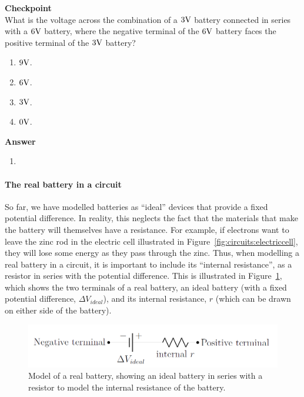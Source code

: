 \begin{framed}
\textbf{Checkpoint}\\
What is the voltage across the combination of a $3 {\rm V}$ battery connected in series with a $6 {\rm V}$ battery, where the negative terminal of the $6 {\rm V}$ battery faces the positive terminal of the $3 {\rm V}$ battery?

\begin{enumerate}
\item $9 {\rm V}$.
\item $6 {\rm V}$.
\item $3 {\rm V}$.
\item $0 {\rm V}$.
\end{enumerate}

\begin{framed}
\textbf{Answer}\\
\begin{enumerate}
\item
\end{enumerate}
\end{framed}
\end{framed}

\paragraph{The real battery in a circuit}

So far, we have modelled batteries as ``ideal'' devices that provide a fixed potential difference. In reality, this neglects the fact that the materials that make the battery will themselves have a resistance. For example, if electrons want to leave the zinc rod in the electric cell illustrated in Figure~\ref{fig:circuits:electriccell}, they will lose some energy as they pass through the zinc. Thus, when modelling a real battery in a circuit, it is important to include its ``internal resistance'', as a resistor in series with the potential difference. This is illustrated in Figure~\ref{fig:circuits:realbattery}, which shows the two terminals of a real battery, an ideal battery (with a fixed potential difference, $\Delta V_{ideal}$), and its internal resistance, $r$ (which can be drawn on either side of the battery).

\begin{figure}[!htbp]
\centering
\includegraphics[width=0.8\linewidth]{files/realbattery-25df902f5102763e8da286f2d44bddb1.png}
\caption[]{Model of a real battery, showing an ideal battery in series with a resistor to model the internal resistance of the battery.}
\label{fig:circuits:realbattery}
\end{figure}

